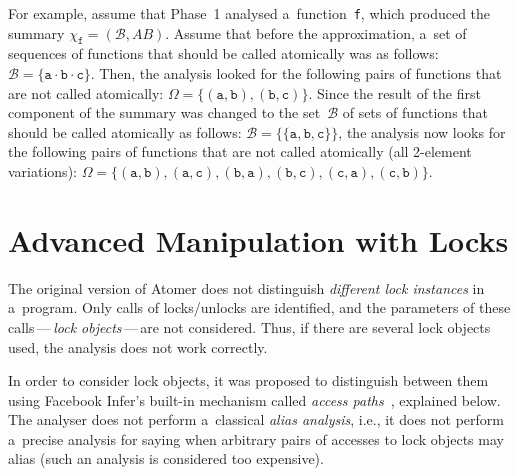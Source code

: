 \begin{example}
    For example, assume that Phase~1 analysed a~function~\texttt{f}, which produced the summary $ \chi_\mathtt{f} = (\mathcal{B}, AB) $. Assume that before the approximation, a~set of sequences of functions that should be called atomically was as follows: $ \mathcal{B} = \{\mathtt{a} \cdot \mathtt{b} \cdot \mathtt{c}\} $. Then, the analysis looked for the following pairs of functions that are not called atomically: $ \Omega = \{(\mathtt{a, b}), (\mathtt{b, c})\} $. Since the result of the first component of the summary was changed to the set~$ \mathcal{B} $ of sets of functions that should be called atomically as follows: $ \mathcal{B} = \{\{\mathtt{a}, \mathtt{b}, \mathtt{c}\}\} $, the analysis now looks for the following pairs of functions that are not called atomically (all 2-element variations): $ \Omega = \{(\mathtt{a}, \mathtt{b}), (\mathtt{a}, \mathtt{c}), (\mathtt{b}, \mathtt{a}), (\mathtt{b}, \mathtt{c}), (\mathtt{c}, \mathtt{a}), (\mathtt{c}, \mathtt{b})\} $.
\end{example}


\section{Advanced Manipulation with Locks}
\label{sec:proposalAdvancedLocks}

The original version of Atomer does not distinguish \emph{different lock instances} in a~program. Only calls of locks/unlocks are identified, and the parameters of these calls\,---\,\emph{lock objects}\,---\,are not considered. Thus, if there are several lock objects used, the analysis does not work correctly.

In order to consider lock objects, it was proposed to distinguish between them using Facebook Infer's built-in mechanism called \emph{access paths}~\cite{accessPath}, explained below. The analyser does not perform a~classical \emph{alias analysis}, i.e., it does not perform a~precise analysis for saying when arbitrary pairs of accesses to lock objects may alias (such an analysis is considered too expensive).

